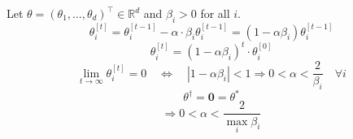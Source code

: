 \begin{answer}
Let $\theta = (\theta_1, \ldots, \theta_d)^\top \in \mathbb{R}^d$ and $\beta_i > 0$ for all $i$.
\[
\theta_i^{[t]} = \theta_i^{[t-1]} - \alpha \cdot \beta_i \theta_i^{[t-1]} = (1 - \alpha \beta_i)\theta_i^{[t-1]}
\]
\[
\theta_i^{[t]} = (1 - \alpha \beta_i)^t \cdot \theta_i^{[0]}
\]
\[
\lim_{t \to \infty} \theta_i^{[t]} = 0 \quad \Longleftrightarrow \quad |1 - \alpha \beta_i| < 1
\Rightarrow 0 < \alpha < \frac{2}{\beta_i} \quad \forall i
\]
\[
\boxed{\theta^\dagger = \mathbf{0} = \theta^*}
\]
\[
\Rightarrow\boxed{0 < \alpha < \frac{2}{\max_i \beta_i}}
\]
\end{answer}